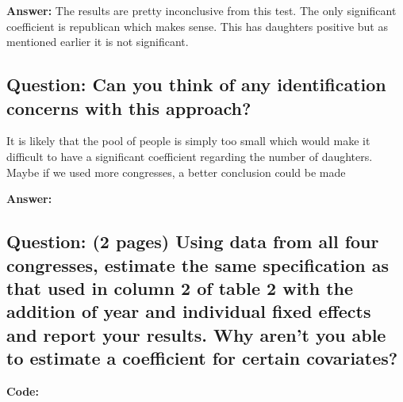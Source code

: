 \documentclass[
]{article}
\begin{document}
\textbf{Answer:} The results are pretty inconclusive from this test. The
only significant coefficient is republican which makes sense. This has
daughters positive but as mentioned earlier it is not significant.

\clearpage

\hypertarget{question-can-you-think-of-any-identification-concerns-with-this-approach}{%
\subsection{Question: Can you think of any identification concerns with
this
approach?}\label{question-can-you-think-of-any-identification-concerns-with-this-approach}}

It is likely that the pool of people is simply too small which would
make it difficult to have a significant coefficient regarding the number
of daughters. Maybe if we used more congresses, a better conclusion
could be made

\textbf{Answer:} \clearpage

\hypertarget{question-2-pages-using-data-from-all-four-congresses-estimate-the-same-specification-as-that-used-in-column-2-of-table-2-with-the-addition-of-year-and-individual-fixed-effects-and-report-your-results.-why-arent-you-able-to-estimate-a-coefficient-for-certain-covariates}{%
\subsection{Question: (2 pages) Using data from all four congresses,
estimate the same specification as that used in column 2 of table 2 with
the addition of year and individual fixed effects and report your
results. Why aren't you able to estimate a coefficient for certain
covariates?}\label{question-2-pages-using-data-from-all-four-congresses-estimate-the-same-specification-as-that-used-in-column-2-of-table-2-with-the-addition-of-year-and-individual-fixed-effects-and-report-your-results.-why-arent-you-able-to-estimate-a-coefficient-for-certain-covariates}}

\textbf{Code:}
\end{document}
